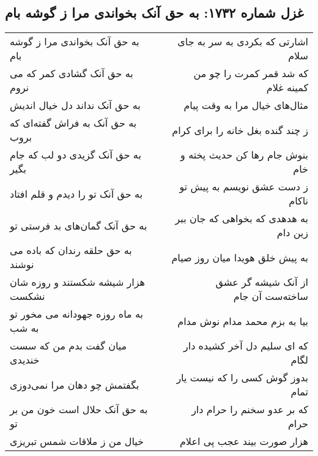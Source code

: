 \begin{center}
\section*{غزل شماره ۱۷۳۲: به حق آنک بخواندی مرا ز گوشه بام}
\label{sec:1732}
\begin{longtable}{l p{0.5cm} r}
به حق آنک بخواندی مرا ز گوشه بام
&&
اشارتی که بکردی به سر به جای سلام
\\
به حق آنک گشادی کمر که می نروم
&&
که شد قمر کمرت را چو من کمینه غلام
\\
به حق آنک نداند دل خیال اندیش
&&
مثال‌های خیال مرا به وقت پیام
\\
به حق آنک به فراش گفته‌ای که بروب
&&
ز چند گنده بغل خانه را برای کرام
\\
به حق آنک گزیدی دو لب که جام بگیر
&&
بنوش جام رها کن حدیث پخته و خام
\\
به حق آنک تو را دیدم و قلم افتاد
&&
ز دست عشق نویسم به پیش تو ناکام
\\
به حق آنک گمان‌های بد فرستی تو
&&
به هدهدی که بخواهی که جان ببر زین دام
\\
به حق حلقه رندان که باده می نوشند
&&
به پیش خلق هویدا میان روز صیام
\\
هزار شیشه شکستند و روزه شان نشکست
&&
از آنک شیشه گر عشق ساخته‌ست آن جام
\\
به ماه روزه جهودانه می مخور تو به شب
&&
بیا به بزم محمد مدام نوش مدام
\\
میان گفت بدم من که سست خندیدی
&&
که ای سلیم دل آخر کشیده دار لگام
\\
بگفتمش چو دهان مرا نمی‌دوزی
&&
بدوز گوش کسی را که نیست یار تمام
\\
به حق آنک حلال است خون من بر تو
&&
که بر عدو سخنم را حرام دار حرام
\\
خیال من ز ملاقات شمس تبریزی
&&
هزار صورت بیند عجب پی اعلام
\\
\end{longtable}
\end{center}

